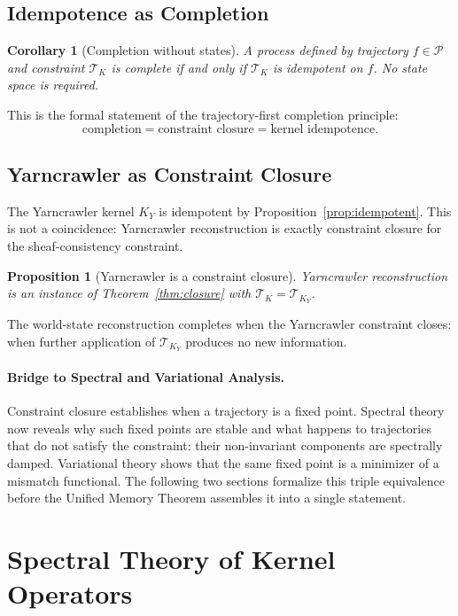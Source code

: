 \documentclass[12pt]{article}
\newtheorem{proposition}[theorem]{Proposition}
\newtheorem{corollary}[theorem]{Corollary}
\newcommand{\Pcal}{\mathcal{P}}
\begin{document}
\subsection{Idempotence as Completion}

\begin{corollary}[Completion without states]
A process defined by trajectory $f \in \Pcal$ and constraint $\mathcal{T}_K$
is \emph{complete} if and only if $\mathcal{T}_K$ is idempotent on $f$.
No state space is required.
\end{corollary}

This is the formal statement of the trajectory-first completion principle:
\[
  \text{completion} = \text{constraint closure} = \text{kernel idempotence}.
\]

\subsection{Yarncrawler as Constraint Closure}

The Yarncrawler kernel $K_Y$ is idempotent by Proposition~\ref{prop:idempotent}.
This is not a coincidence: Yarncrawler reconstruction is exactly constraint
closure for the sheaf-consistency constraint.

\begin{proposition}[Yarncrawler is a constraint closure]
Yarncrawler reconstruction is an instance of Theorem~\ref{thm:closure}
with $\mathcal{T}_K = \mathcal{T}_{K_Y}$.
\end{proposition}

The world-state reconstruction completes when the Yarncrawler constraint
closes: when further application of $\mathcal{T}_{K_Y}$ produces no new
information.

\paragraph{Bridge to Spectral and Variational Analysis.}
Constraint closure establishes when a trajectory is a fixed point. Spectral
theory now reveals why such fixed points are stable and what happens to
trajectories that do not satisfy the constraint: their non-invariant
components are spectrally damped. Variational theory shows that the same
fixed point is a minimizer of a mismatch functional. The following two
sections formalize this triple equivalence before the Unified Memory Theorem
assembles it into a single statement.


\section{Spectral Theory of Kernel Operators}
\label{sec:spectral}
\end{document}
